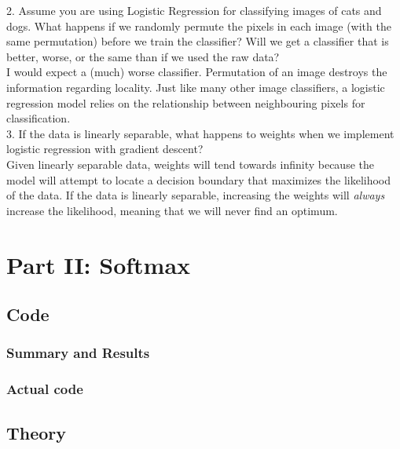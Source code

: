 \documentclass[english,11pt,a4paper,titlepage]{report}
\begin{document}
	\pagebreak
	
	2. Assume you are using Logistic Regression for classifying images of cats and dogs. What happens if we randomly permute the pixels in each image (with the same permutation) before we train the classifier? Will we get a classifier that is better, worse, or the same than if we used the raw data?
	\\
	
	I would expect a (much) worse classifier. Permutation of an image destroys the information regarding locality. Just like many other image classifiers, a logistic regression model relies on the relationship between neighbouring pixels for classification. \\
	
	3. If the data is linearly separable, what happens to weights when we implement logistic regression with gradient descent?
	\\
	
	Given linearly separable data, weights will tend towards infinity because the model will attempt to locate a decision boundary that maximizes the likelihood of the data. If the data is linearly separable, increasing the weights will \textit{always} increase the likelihood, meaning that we will never find an optimum.
	
	\section*{Part II: Softmax}
	\subsection*{Code}
	\subsubsection{Summary and Results}
	
	\subsubsection{Actual code}
	
	\subsection*{Theory}	
	
	
	
	
	
\end{document}
